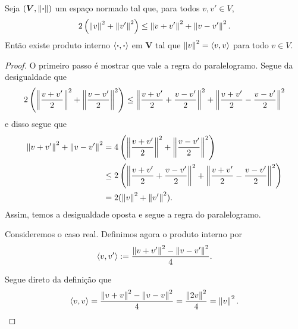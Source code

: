 \begin{proposition}
Seja $(\bm V,\left\Vert{\bm{\cdot}}\right\Vert)$ um espaço normado tal que, para todos $v,v' \in V$,
	\begin{equation*}
	2\left( \left\Vert{v}\right\Vert^2 + \left\Vert{v'}\right\Vert^2 \right) \leq \left\Vert{v+v'}\right\Vert^2+\left\Vert{v-v'}\right\Vert^2.
	\end{equation*}
Então existe produto interno $\left\langle{\bm{\cdot}},{\bm{\cdot}}\right\rangle$ em $\bm V$ tal que $\left\Vert{v}\right\Vert^2=\left\langle{v},{v}\right\rangle$ para todo $v \in V$.
\end{proposition}
\begin{proof}
O primeiro passo é mostrar que vale a regra do paralelogramo. Segue da desigualdade que
	\begin{equation*}
		2\left( \left\Vert{\frac{v+v'}{2}}\right\Vert^2 + \left\Vert{\frac{v-v'}{2}}\right\Vert^2 \right) \leq \left\Vert{\frac{v+v'}{2} + \frac{v-v'}{2}}\right\Vert^2+\left\Vert{\frac{v+v'}{2} - \frac{v-v'}{2}}\right\Vert^2
	\end{equation*}
e disso segue que
	\begin{align*}
		\left\Vert{v+v'}\right\Vert^2 + \left\Vert{v-v'}\right\Vert^2 &= 4\left( \left\Vert{\frac{v+v'}{2}}\right\Vert^2 + \left\Vert{\frac{v-v'}{2}}\right\Vert^2 \right) \\
			&\leq 2\left( \left\Vert{\frac{v+v'}{2} + \frac{v-v'}{2}}\right\Vert^2+\left\Vert{\frac{v+v'}{2} - \frac{v-v'}{2}}\right\Vert^2 \right) \\
			&= 2(\left\Vert{v}\right\Vert^2 + \left\Vert{v'}\right\Vert^2).
	\end{align*}
Assim, temos a desigualdade oposta e segue a regra do paralelogramo.

Consideremos o caso real. Definimos agora o produto interno por
	\begin{equation*}
	\left\langle{v},{v'}\right\rangle := \frac{\left\Vert{v+v'}\right\Vert^2 - \left\Vert{v-v'}\right\Vert^2}{4}.
	\end{equation*}

Segue direto da definição que
	\begin{equation*}
		\left\langle{v},{v}\right\rangle = \frac{\left\Vert{v+v}\right\Vert^2-\left\Vert{v-v}\right\Vert^2}{4} = \frac{\left\Vert{2v}\right\Vert^2}{4} = \left\Vert{v}\right\Vert^2.
	\end{equation*}


\end{proof}
